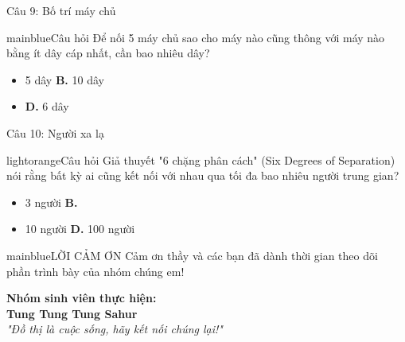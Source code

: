 \documentclass[10pt, xcolor={dvipsnames}]{beamer}
\begin{document}
\begin{frame}{Câu 9: Bố trí máy chủ}
    \begin{gamebox}{mainblue}{Câu hỏi}
        Để nối 5 máy chủ sao cho máy nào cũng thông với máy nào bằng ít dây cáp nhất, cần bao nhiêu dây?
    \end{gamebox}
    \begin{itemize}
        \item[\textbf{A.}] 5 dây \quad \quad \quad \quad \textbf{B.} 10 dây
        \item[\textbf{C.}]  \quad \textbf{D.} 6 dây
    \end{itemize}
\end{frame}

\begin{frame}{Câu 10: Người xa lạ}
    \begin{gamebox}{lightorange}{Câu hỏi}
        Giả thuyết "6 chặng phân cách" (Six Degrees of Separation) nói rằng bất kỳ ai cũng kết nối với nhau qua tối đa bao nhiêu người trung gian?
    \end{gamebox}
    \begin{itemize}
        \item[\textbf{A.}] 3 người \quad \quad \quad \quad \textbf{B.} 
        \item[\textbf{C.}] 10 người \quad \quad \quad \quad \textbf{D.} 100 người
    \end{itemize}
\end{frame}

\begin{frame}[plain]
    \centering
    
    \vspace{0.6cm}
    \begin{gamebox}{mainblue}{LỜI CẢM ƠN}
        \centering
        Cảm ơn thầy và các bạn đã dành thời gian theo dõi \\ phần trình bày của nhóm chúng em!
    \end{gamebox}
    
    \vspace{0.4cm}
    \textbf{Nhóm sinh viên thực hiện:} \\
    \textcolor{mainblue}{\Large \textbf{Tung Tung Tung Sahur}} \\
    \vspace{0.4cm}
    \textit{"Đồ thị là cuộc sống, hãy kết nối chúng lại!"}
\end{frame}
\end{document}
